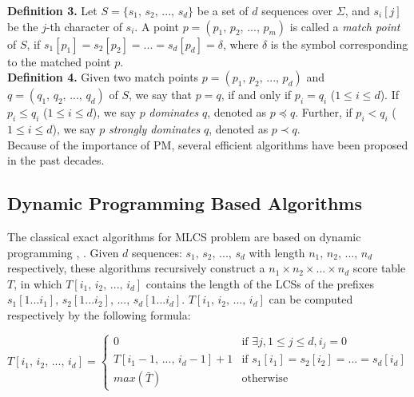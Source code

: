 \documentclass{article}
\begin{document}
\textbf{Definition 3.} Let $S = \{s_1,\, s_2,\, ...,\, s_d\}$ be a set
of $d$ sequences over $\Sigma$, and $s_i[j]$ be the $j$-th character
of $s_i$. A point $p = (p_1,\, p_2,\, ...,\, p_m)$ is called a
\emph{match point} of $S$, if $s_1[p_1] = s_2[p_2] = ... = s_d[p_d] =
\delta$, where $\delta$ is the symbol corresponding to the matched
point $p$.\\

\textbf{Definition 4.} Given two match points $p = (p_1,\, p_2,\,
...,\, p_d)$ and $q = (q_1,\, q_2,\, ...,\, q_d)$ of $S$, we say that
$p = q$, if and only if $p_i = q_i$ ($1 \leq i \leq d$). If $p_i \leq
q_i$ ($1 \leq i \leq d$), we say $p$ \emph{dominates} $q$, denoted as
$p \preceq q$. Further, if $p_i < q_i$ ($1 \leq i \leq d$), we say $p$
\emph{strongly dominates} $q$, denoted as $p \prec q$.\\

Because of the importance of PM, several efficient algorithms have
been proposed in the past decades.

\subsection{Dynamic Programming Based Algorithms}
\label{sec:DP}

The classical exact algorithms for MLCS problem are based on dynamic
programming \cite{Smith1981}, \cite{Sankoff1972}. Given $d$ sequences:
$s_1,\, s_2,\,...,\, s_d$ with length $n_1,\, n_2,\, ...,\, n_d$
respectively, these algorithms recursively construct a
$n_1 \times n_2 \times ... \times n_d$ score table $T$, in which
$T[i_1,\, i_2,\, ...,\, i_d]$ contains the length of the LCSs of the
prefixes $s_1[1...i_1]$, $s_2[1...i_2]$, ..., $s_d[1...i_d]$.
$T[i_1,\, i_2,\, ...,\, i_d]$ can be computed respectively by the
following formula:

\begin{equation*}
  T[i_1,\, i_2,\, ...,\, i_d] = 
  \begin{cases}
    0 & \text{if $\exists j, 1 \leq j \leq d, i_j = 0$}\\
    T[i_1-1,\, ...,\, i_d-1] + 1  & \text{if $s_1[i_1] = s_2[i_2] =
      ... = s_d[i_d]$}\\
    max(\bar{T}) & \text{otherwise}
  \end{cases}
\end{equation*}
\end{document}
